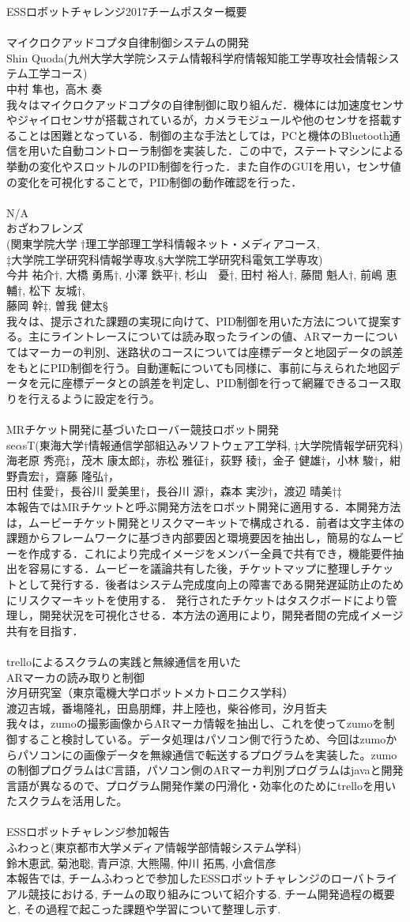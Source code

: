 \documentclass[xelatex,a4paper,ja=standard,jafont=hiragino-pron]{bxjsarticle}
\newcommand*{\team}[4]{\hrulefill\\{\Large #1}\vspace{0.5em}\\{#2}\\{#3}\vspace{0.5em}\\{#4}\vspace{1em}\\}
\begin{document}
{\huge \centering ESSロボットチャレンジ2017チームポスター概要}\\
%
\team{マイクロクアッドコプタ自律制御システムの開発}{Shin Quoda(九州大学大学院システム情報科学府情報知能工学専攻社会情報システム工学コース)}{中村 隼也，高木 奏}{我々はマイクロクアッドコプタの自律制御に取り組んだ．機体には加速度センサやジャイロセンサが搭載されているが，カメラモジュールや他のセンサを搭載することは困難となっている．制御の主な手法としては，PCと機体のBluetooth通信を用いた自動コントローラ制御を実装した．この中で，ステートマシンによる挙動の変化やスロットルのPID制御を行った．また自作のGUIを用い，センサ値の変化を可視化することで，PID制御の動作確認を行った．}    
%
\team{N/A}{おざわフレンズ\\(関東学院大学 †理工学部理工学科情報ネット・メディアコース,\\‡大学院工学研究科情報学専攻,§大学院工学研究科電気工学専攻)}{今井 祐介†, 大橋 勇馬†, 小澤 鉄平†, 杉山　憂†, 田村 裕人†, 藤間 魁人†, 前嶋 恵輔†, 松下 友城†,\\藤岡 幹‡, 曽我 健太§}{我々は、提示された課題の実現に向けて、PID制御を用いた方法について提案する。主にライントレースについては読み取ったラインの値、ARマーカーについてはマーカーの判別、迷路状のコースについては座標データと地図データの誤差をもとにPID制御を行う。自動運転についても同様に、事前に与えられた地図データを元に座標データとの誤差を判定し、PID制御を行って網羅できるコース取りを行えるように設定を行う。}
%
\team{MRチケット開発に基づいたローバー競技ロボット開発}{se$\alpha$sT(東海大学†情報通信学部組込みソフトウェア工学科, ‡大学院情報学研究科)}{海老原 秀亮‡，茂木 康太郎‡，赤松 雅征†，荻野 稜†，金子 健雄†，小林 駿†，紺野貴宏†，齋藤 隆弘†，\\田村 佳愛†，長谷川 愛美里†，長谷川 源†，森本 実沙†，渡辺 晴美†‡}{本報告ではMRチケットと呼ぶ開発方法をロボット開発に適用する．本開発方法は，ムービーチケット開発とリスクマーキットで構成される．前者は文字主体の課題からフレームワークに基づき内部要因と環境要因を抽出し，簡易的なムービーを作成する．これにより完成イメージをメンバー全員で共有でき，機能要件抽出を容易にする．ムービーを議論共有した後，チケットマップに整理しチケットとして発行する．後者はシステム完成度向上の障害である開発遅延防止のためにリスクマーキットを使用する． 発行されたチケットはタスクボードにより管理し，開発状況を可視化させる．本方法の適用により，開発者間の完成イメージ共有を目指す．}
%
\newpage\team{trelloによるスクラムの実践と無線通信を用いた\\ARマーカの読み取りと制御}{汐月研究室（東京電機大学ロボットメカトロニクス学科）}{渡辺吉城，番塲隆礼，田島朋輝，井上陸也，柴谷修司，汐月哲夫}{我々は，zumoの撮影画像からARマーカ情報を抽出し、これを使ってzumoを制御すること検討している。データ処理はパソコン側で行うため、今回はzumoからパソコンにの画像データを無線通信で転送するプログラムを実装した。zumoの制御プログラムはC言語，パソコン側のARマーカ判別プログラムはjavaと開発言語が異なるので、プログラム開発作業の円滑化・効率化のためにtrelloを用いたスクラムを活用した。}
%
\team{ESSロボットチャレンジ参加報告}{ふわっと(東京都市大学メディア情報学部情報システム学科)}{鈴木恵武, 菊池聡, 青戸涼, 大熊陽, 仲川 拓馬, 小倉信彦}{本報告では, チームふわっとで参加したESSロボットチャレンジのローバトライアル競技における, チームの取り組みについて紹介する. チーム開発過程の概要と, その過程で起こった課題や学習について整理し示す.}
\end{document}
